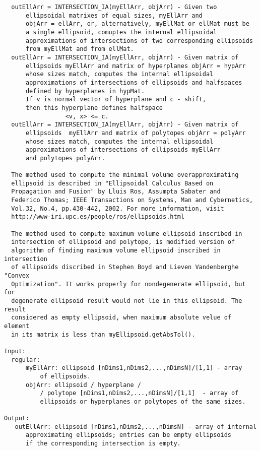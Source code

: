 \begin{enumerate}
\begin{lstlisting}
  outEllArr = INTERSECTION_IA(myEllArr, objArr) - Given two
      ellipsoidal matrixes of equal sizes, myEllArr and
      objArr = ellArr, or, alternatively, myEllMat or ellMat must be
      a single ellipsoid, comuptes the internal ellipsoidal
      approximations of intersections of two corresponding ellipsoids
      from myEllMat and from ellMat.
  outEllArr = INTERSECTION_IA(myEllArr, objArr) - Given matrix of
      ellipsoids myEllArr and matrix of hyperplanes objArr = hypArr
      whose sizes match, computes the internal ellipsoidal
      approximations of intersections of ellipsoids and halfspaces
      defined by hyperplanes in hypMat.
      If v is normal vector of hyperplane and c - shift,
      then this hyperplane defines halfspace
                 <v, x> <= c.
  outEllArr = INTERSECTION_IA(myEllArr, objArr) - Given matrix of
      ellipsoids  myEllArr and matrix of polytopes objArr = polyArr
      whose sizes match, computes the internal ellipsoidal
      approximations of intersections of ellipsoids myEllArr
      and polytopes polyArr.

  The method used to compute the minimal volume overapproximating
  ellipsoid is described in "Ellipsoidal Calculus Based on
  Propagation and Fusion" by Lluis Ros, Assumpta Sabater and
  Federico Thomas; IEEE Transactions on Systems, Man and Cybernetics,
  Vol.32, No.4, pp.430-442, 2002. For more information, visit
  http://www-iri.upc.es/people/ros/ellipsoids.html

  The method used to compute maximum volume ellipsoid inscribed in
  intersection of ellipsoid and polytope, is modified version of
  algorithm of finding maximum volume ellipsoid inscribed in intersection
  of ellipsoids discribed in Stephen Boyd and Lieven Vandenberghe "Convex
  Optimization". It works properly for nondegenerate ellipsoid, but for
  degenerate ellipsoid result would not lie in this ellipsoid. The result
  considered as empty ellipsoid, when maximum absolute velue of element
  in its matrix is less than myEllipsoid.getAbsTol().

Input:
  regular:
      myEllArr: ellipsoid [nDims1,nDims2,...,nDimsN]/[1,1] - array
          of ellipsoids.
      objArr: ellipsoid / hyperplane /
          / polytope [nDims1,nDims2,...,nDimsN]/[1,1]  - array of
          ellipsoids or hyperplanes or polytopes of the same sizes.

Output:
   outEllArr: ellipsoid [nDims1,nDims2,...,nDimsN] - array of internal
      approximating ellipsoids; entries can be empty ellipsoids
      if the corresponding intersection is empty.


\end{lstlisting}
\end{enumerate}

